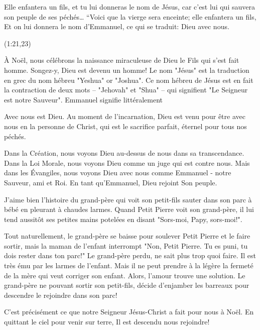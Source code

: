 

\epigraph{%
Elle enfantera un fils, et tu lui donneras le nom de Jésus, car c’est lui qui sauvera son peuple de ses péchés… “Voici que la vierge sera enceinte; elle enfantera un fils, Et on lui donnera le nom d’Emmanuel, ce qui se traduit: Dieu avec nous.}{%
(1:21,23)}

À Noël, nous célébrons la naissance miraculeuse de Dieu le Fils qui s'est fait homme. Songez-y, Dieu est devenu un homme! Le nom "Jésus" est la traduction en grec du nom hébreu "Yeshua" or "Joshua". Ce nom hébreu de Jésus est en fait la contraction de deux mots – "Jehovah" et "Shua" – qui signifient "Le Seigneur est notre Sauveur". Emmanuel signifie littéralement

\og Avec nous est Dieu. \fg{} Au moment de l'incarnation, Dieu est venu pour être avec nous en la personne de Christ, qui est le sacrifice parfait, éternel pour tous nos péchés.

Dans la Création, nous voyons Dieu au-dessus de nous dans sa transcendance. Dans la Loi Morale, nous voyons Dieu comme un juge qui est contre nous. Mais dans les Évangiles, nous voyons Dieu avec nous comme Emmanuel - notre Sauveur, ami et Roi. En tant qu'Emmanuel, Dieu rejoint Son peuple.

J'aime bien l'histoire du grand-père qui voit son petit-fils sauter dans son parc à bébé en pleurant à chaudes larmes. Quand Petit Pierre voit son grand-père, il lui tend aussitôt ses petites mains potelées en disant "Sors-moi, Papy, sors-moi!".

Tout naturellement, le grand-père se baisse pour soulever Petit Pierre et le faire sortir, mais la maman de l'enfant interrompt "Non, Petit Pierre. Tu es puni, tu dois rester dans ton parc!" Le grand-père perdu, ne sait plus trop quoi faire. Il est très ému par les larmes de l'enfant. Mais il ne peut prendre à la légère la fermeté de la mère qui veut corriger son enfant. Alors, l'amour trouve une solution. Le grand-père ne pouvant sortir son petit-fils, décide d'enjamber les barreaux pour descendre le rejoindre dans son parc!

C'est précisément ce que notre Seigneur Jésus-Christ a fait pour nous à Noël. En quittant le ciel pour venir sur terre, Il est descendu nous rejoindre!


